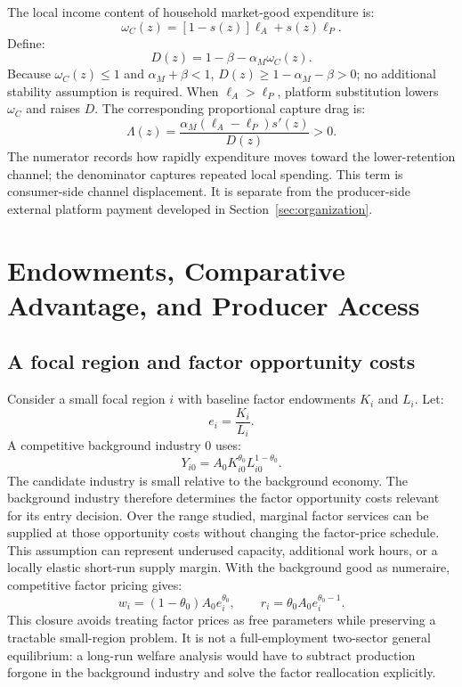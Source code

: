\documentclass[11pt]{article}
\theoremstyle{definition}
\theoremstyle{remark}
\begin{document}
The local income content of household market-good expenditure is:
\begin{equation}
 \omega_C(z)=[1-s(z)]\ell_A+s(z)\ell_P.
 \label{eq:consumer_retention}
\end{equation}
Define:
\begin{equation}
 D(z)=1-\beta-\alpha_M\omega_C(z).
 \label{eq:denominator}
\end{equation}
Because \(\omega_C(z)\leq1\) and \(\alpha_M+\beta<1\),
\(D(z)\geq1-\alpha_M-\beta>0\); no additional stability assumption is
required.  When
\(\ell_A>\ell_P\), platform substitution lowers \(\omega_C\) and raises
\(D\).  The corresponding proportional capture drag is:
\begin{equation}
 \Lambda(z)=
 \frac{\alpha_M(\ell_A-\ell_P)s'(z)}
 {D(z)}>0.
 \label{eq:capture_drag}
\end{equation}
The numerator records how rapidly expenditure moves toward the lower-retention
channel; the denominator captures repeated local spending.  This term is
consumer-side channel displacement.  It is separate from the producer-side
external platform payment developed in Section~\ref{sec:organization}.

\section{Endowments, Comparative Advantage, and Producer Access}

\subsection{A focal region and factor opportunity costs}

Consider a small focal region \(i\) with baseline factor endowments \(K_i\) and
\(L_i\).  Let:
\begin{equation}
 e_i=\frac{K_i}{L_i}.
 \label{eq:endowment_ratio}
\end{equation}
A competitive background industry \(0\) uses:
\begin{equation}
 Y_{i0}=A_0K_{i0}^{\theta_0}L_{i0}^{1-\theta_0}.
 \label{eq:background_technology}
\end{equation}
The candidate industry is small relative to the background economy.  The
background industry therefore determines the factor opportunity costs
relevant for its entry decision.  Over the range studied, marginal factor
services can be supplied at those opportunity costs without changing the
factor-price schedule.  This assumption can represent underused capacity,
additional work hours, or a locally elastic short-run supply margin.  With the
background good as numeraire, competitive factor pricing gives:
\begin{equation}
 w_i=(1-\theta_0)A_0e_i^{\theta_0},
 \qquad
 r_i=\theta_0A_0e_i^{\theta_0-1}.
 \label{eq:factor_prices}
\end{equation}
This closure avoids treating factor prices as free parameters while preserving
a tractable small-region problem.  It is not a full-employment two-sector
general equilibrium: a long-run welfare analysis would have to subtract
production forgone in the background industry and solve the factor
reallocation explicitly.
\end{document}
